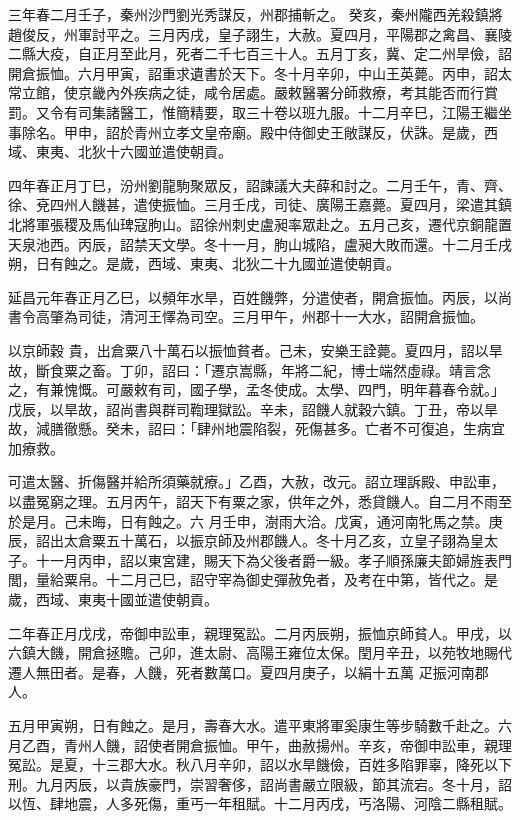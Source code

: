 \begin{pinyinscope}
 三年春二月壬子，秦州沙門劉光秀謀反，州郡捕斬之。
 癸亥，秦州隴西羌殺鎮將趙俊反，州軍討平之。三月丙戌，皇子詡生，大赦。夏四月，平陽郡之禽昌、襄陵二縣大疫，自正月至此月，死者二千七百三十人。五月丁亥，冀、定二州旱儉，詔開倉振恤。六月甲寅，詔重求遺書於天下。冬十月辛卯，中山王英薨。丙申，詔太常立館，使京畿內外疾病之徒，咸令居處。嚴敕醫署分師救療，考其能否而行賞罰。又令有司集諸醫工，惟簡精要，取三十卷以班九服。十二月辛巳，江陽王繼坐事除名。甲申，詔於青州立孝文皇帝廟。殿中侍御史王敞謀反，伏誅。是歲，西域、東夷、北狄十六國並遣使朝貢。



 四年春正月丁巳，汾州劉龍駒聚眾反，詔諫議大夫薛和討之。二月壬午，青、齊、徐、兗四州人饑甚，遣使振恤。三月壬戌，司徒、廣陽王嘉薨。夏四月，梁遣其鎮北將軍張稷及馬仙琕寇朐山。詔徐州刺史盧昶率眾赴之。五月己亥，遷代京銅龍置天泉池西。丙辰，詔禁天文學。冬十一月，朐山城陷，盧昶大敗而還。十二月壬戌朔，日有蝕之。是歲，西域、東夷、北狄二十九國並遣使朝貢。



 延昌元年春正月乙巳，以頻年水旱，百姓饑弊，分遣使者，開倉振恤。丙辰，以尚書令高肇為司徒，清河王懌為司空。三月甲午，州郡十一大水，詔開倉振恤。



 以京師穀
 貴，出倉粟八十萬石以振恤貧者。己未，安樂王詮薨。夏四月，詔以旱故，斷食粟之畜。丁卯，詔曰：「遷京嵩縣，年將二紀，博士端然虛祿。靖言念之，有兼愧慨。可嚴敕有司，國子學，孟冬使成。太學、四門，明年暮春令就。」戊辰，以旱故，詔尚書與群司鞫理獄訟。辛未，詔饑人就穀六鎮。丁丑，帝以旱故，減膳徹懸。癸未，詔曰：「肆州地震陷裂，死傷甚多。亡者不可復追，生病宜加療救。



 可遣太醫、折傷醫并給所須藥就療。」乙酉，大赦，改元。詔立理訴殿、申訟車，以盡冤窮之理。五月丙午，詔天下有粟之家，供年之外，悉貸饑人。自二月不雨至於是月。己未晦，日有蝕之。六
 月壬申，澍雨大洽。戊寅，通河南牝馬之禁。庚辰，詔出太倉粟五十萬石，以振京師及州郡饑人。冬十月乙亥，立皇子詡為皇太子。十一月丙申，詔以東宮建，賜天下為父後者爵一級。孝子順孫廉夫節婦旌表門閭，量給粟帛。十二月己巳，詔守宰為御史彈赦免者，及考在中第，皆代之。是歲，西域、東夷十國並遣使朝貢。



 二年春正月戊戌，帝御申訟車，親理冤訟。二月丙辰朔，振恤京師貧人。甲戌，以六鎮大饑，開倉拯贍。己卯，進太尉、高陽王雍位太保。閏月辛丑，以苑牧地賜代遷人無田者。是春，人饑，死者數萬口。夏四月庚子，以絹十五萬
 疋振河南郡人。



 五月甲寅朔，日有蝕之。是月，壽春大水。遣平東將軍奚康生等步騎數千赴之。六月乙酉，青州人饑，詔使者開倉振恤。甲午，曲赦揚州。辛亥，帝御申訟車，親理冤訟。是夏，十三郡大水。秋八月辛卯，詔以水旱饑儉，百姓多陷罪辜，降死以下刑。九月丙辰，以貴族豪門，崇習奢侈，詔尚書嚴立限級，節其流宕。冬十月，詔以恆、肆地震，人多死傷，重丐一年租賦。十二月丙戌，丐洛陽、河陰二縣租賦。




\end{pinyinscope}
